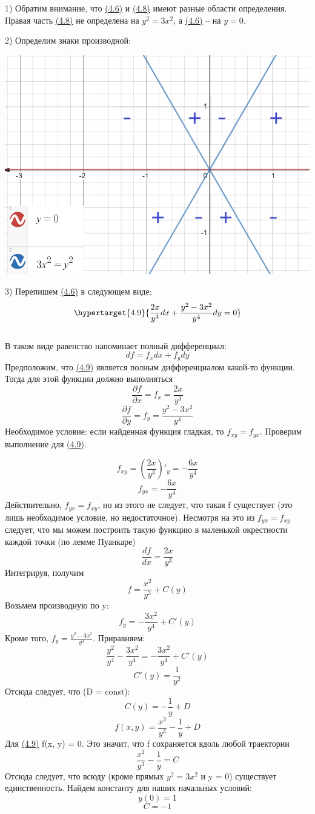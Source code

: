 \documentclass[10pt]{report}
\begin{document}
1) Обратим внимание, что \hyperlink{4.6}{(4.6)} и \hyperlink{4.8}{(4.8)} имеют разные области определения. Правая часть \hyperlink{4.8}{(4.8)} не определена на $y^2=3x^2$, а \hyperlink{4.6}{(4.6)} -- на $y=0$.

2) Определим знаки производной:
\begin{center}
{\includegraphics[scale=0.4]{graph4.2.png}} 
\end{center}

3) Перепишем \hyperlink{4.6}{(4.6)} в следующем виде:
\begin{equation}
\hypertarget{4.9}{\frac {2x} {y^3}dx + \frac {y^2-3x^2} {y^4} dy = 0}
\end{equation}\\
В таком виде равенство напоминает полный дифференциал:
\[ df = f_x dx +f_y dy\]
Предположим, что \hyperlink{4.9}{(4.9)} является полным дифференциалом какой-то функции.
Тогда для этой функции должно выполняться
\[ \frac{\partial f}{\partial x}=f_x = \frac {2x} {y^3}\]
\[\frac{\partial f}{\partial y} = f_y = \frac{y^2-3x^2} {y^4}\]
Необходимое условие: если найденная функция гладкая, то $f_{xy}=f_{yx}$. Проверим выполнение для \hyperlink{4.9}{(4.9)}.

\[f_{xy} = \left( \frac {2x} {y^3}\right)'_y = -\frac {6x} {y^4}\]
\[f_{yx} = -\frac {6x} {y^4}\] 
Действительно, $ f_{yx} = f_{xy}$, но из этого не следует, что такая f существует (это лишь необходимое условие, но недостаточное). Несмотря на это из $ f_{yx} = f_{xy}$ следует, что мы можем построить такую функцию в маленькой окрестности каждой точки (по лемме Пуанкаре)
\[ \frac {df} {dx} = \frac{2x}{y^3}\]
Интегрируя, получим
\[ f = \frac {x^2} {y^3} +C(y)\]
Возьмем производную по y:
\[ f_y = -\frac {3x^2} {y^4}+C'(y)\]
Кроме того, $f_y = \frac{y^2-3x^2} {y^4}$. Приравняем:
 \[ \frac {y^2} {y^4}-\frac {3x^2} {y^4} = -\frac {3x^2} {y^4} + C'(y)\]
\[
C'(y) = \frac {1} {y^2}\]
Отсюда следует, что (D = const):
\[ C(y) = -\frac {1} {y}+D\]
\[ f(x, y) = \frac {x^2} {y^3}-\frac {1} {y}+D\]
Для \hyperlink{4.9}{(4.9)}  f(x, y) = 0. Это значит, что f сохраняется вдоль любой траектории
\[ \frac {x^2} {y^3}-\frac {1} {y} = C\]
Отсюда следует, что всюду (кроме прямых $y^2=3x^2$ и y = 0) существует единственность. 
Найдем константу для наших начальных условий:
\[ y (0) = 1\]
\[ C=-1\]
\end{document}
